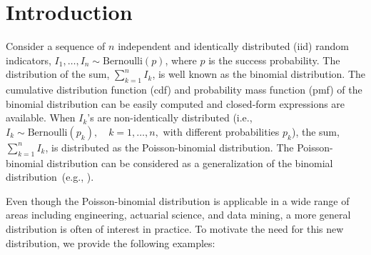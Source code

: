 \documentclass[12pt]{article}
\begin{document}
\newpage


\section{Introduction}\label{sec:introduction}
Consider a sequence of $n$ independent and identically distributed (iid) random indicators, $I_1, \dots, I_n\sim\textrm{Bernoulli}(p)$, where $p$ is the success probability. The distribution of the sum, $\sum_{k=1}^{n}I_k$, is well known as the binomial distribution. The cumulative distribution function (cdf) and probability mass function (pmf) of the binomial distribution can be easily computed and closed-form expressions are available. When $I_k$'s are non-identically distributed (i.e., $I_k\sim\textrm{Bernoulli}(p_k), \quad k=1,\dots,n,$ with different probabilities $p_k$), the sum, $\sum_{k=1}^{n}I_k$, is distributed as the Poisson-binomial distribution. The Poisson-binomial distribution can be considered as a generalization of the binomial distribution~(e.g., ).

Even though the Poisson-binomial distribution is applicable in a wide range of areas including engineering, actuarial science, and data mining, a more general distribution is often of interest in practice. To motivate the need for this new distribution, we provide the following examples:
\end{document}

